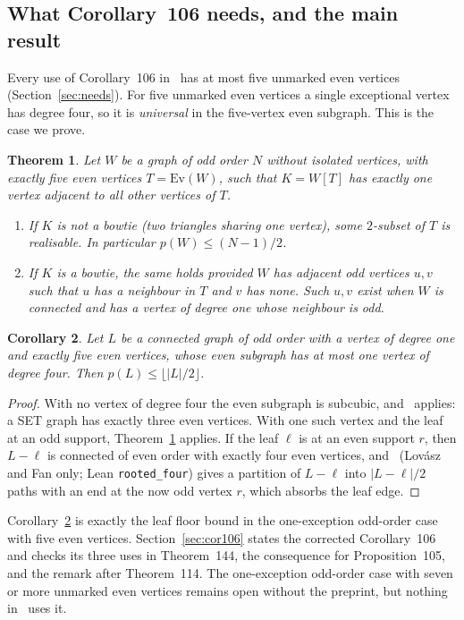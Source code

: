 \documentclass[11pt]{amsart}
\newtheorem{theorem}{Theorem}
\newtheorem{corollary}[theorem]{Corollary}
\theoremstyle{definition}
\newcommand{\Ev}{\mathrm{Ev}}
\begin{document}
\subsection*{What Corollary~106 needs, and the main result}
Every use of Corollary~106 in~\cite{MR} has at most five unmarked even vertices
(Section~\ref{sec:needs}). For five unmarked even vertices a single exceptional vertex has degree
four, so it is \emph{universal} in the five-vertex even subgraph. This is the case we prove.

\begin{theorem}\label{thm:main}
Let $W$ be a graph of odd order $N$ without isolated vertices, with exactly five even vertices
$T=\Ev(W)$, such that $K=W[T]$ has exactly one vertex adjacent to all other vertices of $T$.
\begin{enumerate}
\item[(a)] If $K$ is not a bowtie (two triangles sharing one vertex), some $2$-subset of $T$ is
realisable. In particular $p(W)\le(N-1)/2$.
\item[(b)] If $K$ is a bowtie, the same holds provided $W$ has adjacent odd vertices $u,v$ such that
$u$ has a neighbour in $T$ and $v$ has none. Such $u,v$ exist when $W$ is connected and has a vertex
of degree one whose neighbour is odd.
\end{enumerate}
\end{theorem}

\begin{corollary}\label{cor:bp5}
Let $L$ be a connected graph of odd order with a vertex of degree one and exactly five even
vertices, whose even subgraph has at most one vertex of degree four. Then
$p(L)\le\lfloor|L|/2\rfloor$.
\end{corollary}

\begin{proof}
With no vertex of degree four the even subgraph is subcubic, and~\cite[Theorem~13]{BS} applies: a
SET graph has exactly three even vertices. With one such vertex and the leaf at an odd support,
Theorem~\ref{thm:main} applies. If the leaf $\ell$ is at an even support $r$, then $L-\ell$ is
connected of even order with exactly four even vertices, and~\cite[Corollary~22]{ES} (Lov\'asz and
Fan only; Lean \texttt{rooted\_four}) gives a partition of $L-\ell$ into $|L-\ell|/2$ paths with an
end at the now odd vertex $r$, which absorbs the leaf edge.
\end{proof}

Corollary~\ref{cor:bp5} is exactly the leaf floor bound in the one-exception odd-order case with
five even vertices. Section~\ref{sec:cor106} states the corrected Corollary~106 and checks its three
uses in Theorem~144, the consequence for Proposition~105, and the remark after Theorem~114. The
one-exception odd-order case with seven or more unmarked even vertices remains open without the
preprint, but nothing in~\cite{MR} uses it.
\end{document}

